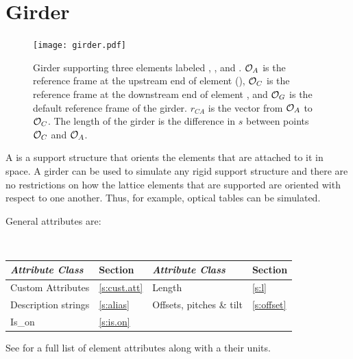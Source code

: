 \section{Girder}
\label{s:girder}

\begin{figure}[t]
  \centering
  \texttt{[image: girder.pdf]}
  \caption[Girder example.] {
Girder supporting three elements labeled , , and .  ${\cal O}_A$ is the reference
frame at the upstream end of element  (), ${\cal O}_C$ is the reference
frame at the downstream end of element , and ${\cal O}_G$ is the default  reference
frame of the girder. $r_{CA}$ is the vector from ${\cal O}_A$ to ${\cal O}_C$. The length  of the
girder is the difference in $s$ between points ${\cal O}_C$ and ${\cal O}_A$.
  }
  \label{f:girder}
\end{figure}

A  is a support structure that orients the elements that are attached to it in space. A
girder can be used to simulate any rigid support structure and there are no restrictions on how the
lattice elements that are supported are oriented with respect to one another.  Thus, for example,
optical tables can be simulated.

General  attributes are:
\begin{center}
\tt
\begin{tabular}{llll} \toprule
  {\sl Attribute Class}      & Section           & {\sl Attribute Class}      & Section         \\ \midrule
  Custom Attributes          & \ref{s:cust.att}  & Length                     & \ref{s:l}       \\
  Description strings        & \ref{s:alias}     & Offsets, pitches \& tilt   & \ref{s:offset}  \\ 
  Is_on                      & \ref{s:is.on}     &                            &                 \\
  \bottomrule
\end{tabular}
\end{center}
\toffset
See  for a full list of element attributes along with a their units.

